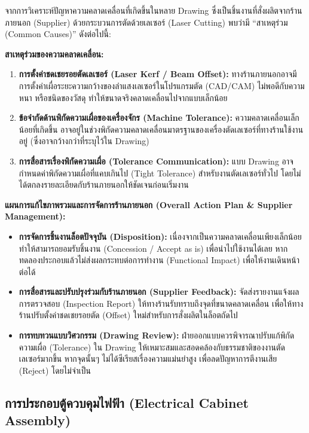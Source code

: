 จากการวิเคราะห์ปัญหาความคลาดเคลื่อนที่เกิดขึ้นในหลาย Drawing ซึ่งเป็นชิ้นงานที่สั่งผลิตจากร้านภายนอก (Supplier) ด้วยกระบวนการตัดด้วยเลเซอร์ (Laser Cutting) พบว่ามี ``สาเหตุร่วม (Common Causes)'' ดังต่อไปนี้:

\textbf{สาเหตุร่วมของความคลาดเคลื่อน:}
\begin{enumerate}
    \item \textbf{การตั้งค่าชดเชยรอยตัดเลเซอร์ (Laser Kerf / Beam Offset):} ทางร้านภายนอกอาจมีการตั้งค่าเผื่อระยะความกว้างของลำแสงเลเซอร์ในโปรแกรมตัด (CAD/CAM) ไม่พอดีกับความหนา หรือชนิดของวัสดุ ทำให้ขนาดจริงคลาดเคลื่อนไปจากแบบเล็กน้อย
    \item \textbf{ข้อจำกัดด้านพิกัดความเผื่อของเครื่องจักร (Machine Tolerance):} ความคลาดเคลื่อนเล็กน้อยที่เกิดขึ้น อาจอยู่ในช่วงพิกัดความคลาดเคลื่อนมาตรฐานของเครื่องตัดเลเซอร์ที่ทางร้านใช้งานอยู่ (ซึ่งอาจกว้างกว่าที่ระบุไว้ใน Drawing)
    \item \textbf{การสื่อสารเรื่องพิกัดความเผื่อ (Tolerance Communication):} แบบ Drawing อาจกำหนดค่าพิกัดความเผื่อที่แคบเกินไป (Tight Tolerance) สำหรับงานตัดเลเซอร์ทั่วไป โดยไม่ได้ตกลงรายละเอียดกับร้านภายนอกให้ชัดเจนก่อนเริ่มงาน
\end{enumerate}

\textbf{แผนการแก้ไขภาพรวมและการจัดการร้านภายนอก (Overall Action Plan \& Supplier Management):}
\begin{itemize}
    \item \textbf{การจัดการชิ้นงานล็อตปัจจุบัน (Disposition):} เนื่องจากเป็นความคลาดเคลื่อนเพียงเล็กน้อย ทำให้สามารถยอมรับชิ้นงาน (Concession / Accept as is) เพื่อนำไปใช้งานได้เลย หากทดลองประกอบแล้วไม่ส่งผลกระทบต่อการทำงาน (Functional Impact) เพื่อให้งานเดินหน้าต่อได้
    \item \textbf{การสื่อสารและปรับปรุงร่วมกับร้านภายนอก (Supplier Feedback):} จัดส่งรายงานแจ้งผลการตรวจสอบ (Inspection Report) ให้ทางร้านรับทราบถึงจุดที่ขนาดคลาดเคลื่อน เพื่อให้ทางร้านปรับตั้งค่าชดเชยรอยตัด (Offset) ใหม่สำหรับการสั่งผลิตในล็อตถัดไป
    \item \textbf{การทบทวนแบบวิศวกรรม (Drawing Review):} ฝ่ายออกแบบควรพิจารณาปรับแก้พิกัดความเผื่อ (Tolerance) ใน Drawing ให้เหมาะสมและสอดคล้องกับธรรมชาติของงานตัดเลเซอร์มากขึ้น หากจุดนั้นๆ ไม่ได้ซีเรียสเรื่องความแม่นยำสูง เพื่อลดปัญหาการตีงานเสีย (Reject) โดยไม่จำเป็น
\end{itemize}

\subsection{การประกอบตู้ควบคุมไฟฟ้า (Electrical Cabinet Assembly)}
\label{subsec:electrical_cabinet_assembly}

